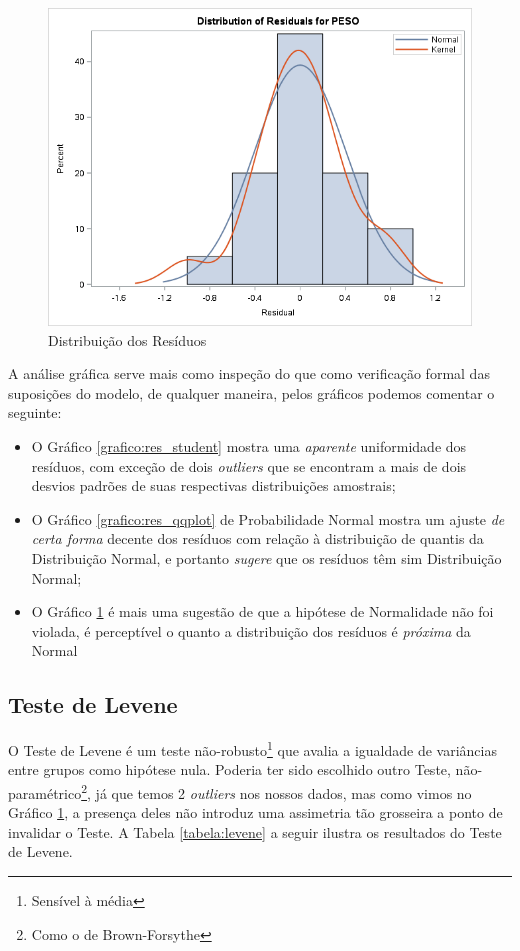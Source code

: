\documentclass[a4paper,12pt,notitlepage]{article}
\begin{document}
\begin{figure}[!htb]
    \centering
    \includegraphics[scale=0.8]{dist_residuos}
    \caption{Distribuição dos Resíduos}
    \label{grafico:dist_residuos}
\end{figure}

    A análise gráfica serve mais como inspeção do que como verificação formal das suposições do modelo, de qualquer maneira, pelos gráficos podemos comentar o seguinte:
    
    \begin{itemize}
        \item O Gráfico \ref{grafico:res_student} mostra uma \textit{aparente} uniformidade dos resíduos, com exceção de dois \textit{outliers} que se encontram a mais de dois desvios padrões de suas respectivas distribuições amostrais;
        \item O Gráfico \ref{grafico:res_qqplot} de Probabilidade Normal mostra um ajuste \textit{de certa forma} decente dos resíduos com relação à distribuição de quantis da Distribuição Normal, e portanto \textit{sugere} que os resíduos têm sim Distribuição Normal;
        \item O Gráfico \ref{grafico:dist_residuos} é mais uma sugestão de que a hipótese de Normalidade não foi violada, é perceptível o quanto a distribuição dos resíduos é \textit{próxima} da Normal
    \end{itemize}
    \newpage
\subsection{Teste de Levene}
    O Teste de Levene é um teste não-robusto\footnote{Sensível à média} que avalia a igualdade de variâncias entre grupos como hipótese nula. Poderia ter sido escolhido outro Teste, não-paramétrico\footnote{Como o de Brown-Forsythe}, já que temos 2 \textit{outliers} nos nossos dados, mas como vimos no Gráfico \ref{grafico:dist_residuos}, a presença deles não introduz uma assimetria tão grosseira a ponto de invalidar o Teste. A Tabela \ref{tabela:levene} a seguir ilustra os resultados do Teste de Levene.
    
\end{document}

